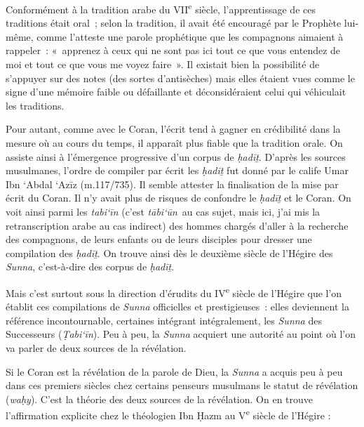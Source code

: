 Conformément à la tradition arabe du VII\textsuperscript{e} siècle,
l'apprentissage de ces traditions était oral~; selon la tradition, il
avait été encouragé par le Prophète lui-même, comme l'atteste une parole
prophétique que les compagnons aimaient à rappeler~: «~apprenez à ceux
qui ne sont pas ici tout ce que vous entendez de moi et tout ce que vous
me voyez faire~». Il existait bien la possibilité de s'appuyer sur des
notes (des sortes d'antisèches) mais elles étaient vues comme le signe
d'une mémoire faible ou défaillante et déconsidéraient celui qui
véhiculait les traditions.

Pour autant, comme avec le Coran, l'écrit tend à gagner en crédibilité
dans la mesure où au cours du temps, il apparaît plus fiable que la
tradition orale. On assiste ainsi à l'émergence progressive d'un corpus
de \emph{ḥadīṯ}. D'après les sources musulmanes, l'ordre de compiler par
écrit les \emph{ḥadīṯ} fut donné par le calife Umar Ibn `Abdal `Azīz
(m.117/735). Il semble attester la finalisation de
la mise par écrit du Coran. Il n'y avait plus de risques de confondre le
\emph{ḥadīṯ} et le Coran. On voit ainsi parmi les \emph{tabi`īn} (c'est
\emph{tābi`ūn}~au cas sujet, mais ici, j'ai mis la retranscription arabe
au cas indirect) des hommes chargés d'aller à la recherche des
compagnons, de leurs enfants ou de leurs disciples pour dresser une
compilation des \emph{ḥadīṯ}. On trouve ainsi dès le deuxième siècle de
l'Hégire des \emph{Sunna}, c'est-à-dire des corpus de \emph{ḥadīṯ}.

Mais c'est surtout sous la direction d'érudits du IV\textsuperscript{e}
siècle de l'Hégire que l'on établit ces compilations de \emph{Sunna}
officielles et prestigieuses~: elles deviennent la référence
incontournable, certaines intégrant intégralement, les \emph{Sunna} des
Successeurs (\emph{Ṭabi`īn}). Peu à peu, la \emph{Sunna} acquiert une
autorité au point où l'on va parler de deux sources de la révélation.


Si le Coran est la révélation de la parole de Dieu, la \emph{Sunna} a
acquis peu à peu dans ces premiers siècles chez certains penseurs
musulmans le statut de révélation (\emph{waḥy}). C'est la théorie des
deux sources de la révélation. On en trouve l'affirmation explicite chez
le théologien Ibn Ḥazm au V\textsuperscript{e} siècle de l'Hégire :

